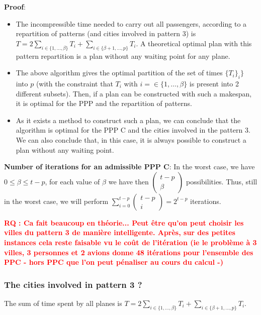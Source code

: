 \documentclass[a4paper,11pt]{article}
\newcommand{\myred}[1]
{\textcolor{red}{\bf {#1}}
}
\begin{document}
{\bf Proof}: 
\begin{itemize}
\item The incompressible time needed to carry out all passengers, according to a repartition of patterns (and cities involved in pattern 3) is $T = 2\sum_{i\in\{1,\ldots, \beta\}} T_i + \sum_{i\in\{\beta + 1,\ldots, p\}}T_i$. A theoretical optimal plan with this pattern repartition is a plan without any waiting point for any plane.
\item The above algorithm gives the optimal partition of the set of times $\{T_i\}_i\}$ into $p$ (with the constraint that $T_i$ with $i=\in\{1,\ldots, \beta\}$ is present into 2 different subsets). Then, if a plan can be constructed with such a makespan, it is optimal for the PPP and the repartition of patterns.
\item As it exists a method to construct such a plan, we can conclude that the algorithm is optimal for the PPP C and the cities involved in the pattern 3. We can also conclude that, in this case, it is always possible to construct a plan without any waiting point.
\end{itemize}

\noindent
{\bf Number of iterations for an admissible PPP C}: In the worst case, we have $0 \leq \beta \leq t-p$, for each value of $\beta$ we have then $\begin{pmatrix} t-p \\ \beta \end{pmatrix}$ possibilities. Thus, still in the worst case, we will perform $\sum_{i=0}^{t-p}\begin{pmatrix} t-p \\ i \end{pmatrix} = 2^{t-p}$ iterations.

\myred{RQ : Ca fait beaucoup en théorie... Peut être qu'on peut choisir les villes du pattern 3 de manière intelligente. Après, sur des petites instances cela reste faisable vu le coût de l'itération (ie le problème à 3 villes, 3 personnes et 2 avions donne 48 itérations pour l'ensemble des PPC - hors PPC que l'on peut pénaliser au cours du calcul -)}

\subsubsection{The cities involved in pattern 3 ?}

The sum of time spent by all planes is $T = 2\sum_{i\in\{1,\ldots, \beta\}} T_i + \sum_{i\in\{\beta + 1,\ldots, p\}}T_i$.\\
\end{document}
